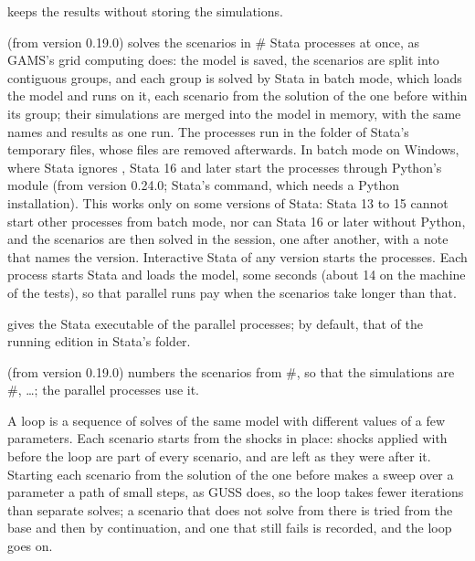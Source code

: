 \begin{optdesc}
\item[\opt{}{nostore}] keeps the results without storing the simulations.

\item[\optarg{par}{allel}{\#}] (from version 0.19.0) solves the scenarios in
\# Stata processes at once, as GAMS's grid computing does: the model is saved,
the scenarios are split into contiguous groups, and each group is solved by
Stata in batch mode, which loads the model and runs  on it,
each scenario from the solution of the one before within its group; their
simulations are merged into the model in memory, with the same names and
results as one run. The processes run in the folder of Stata's temporary
files, whose files are removed afterwards. In batch mode on Windows, where
Stata ignores , Stata 16 and later start the processes through
Python's  module (from version 0.24.0; Stata's 
command, which needs a Python installation). This works only on some
versions of Stata: Stata 13 to 15 cannot start other processes from batch
mode, nor can Stata 16 or later without Python, and the scenarios are then
solved in the session, one after another, with a note that names the
version. Interactive Stata of any version starts the processes. Each process
starts Stata and loads the model, some seconds (about 14 on the machine of
the tests), so that parallel runs pay when the scenarios take longer than
that.

\item[\optarg{stata}{exe}{path}] gives the Stata executable of the parallel
processes; by default, that of the running edition in Stata's folder.

\item[\optarg{}{first}{\#}] (from version 0.19.0) numbers the scenarios from
\#, so that the simulations are \#, \dots; the parallel processes
use it.
\end{optdesc}


A loop is a sequence of solves of the same model with different values of a
few parameters. Each scenario starts from the shocks in place: shocks applied
with  before the loop are part of every scenario, and are
left as they were after it. Starting each scenario from the solution of the
one before makes a sweep over a parameter a path of small steps, as GUSS does,
so the loop takes fewer iterations than separate solves; a scenario that does
not solve from there is tried from the base and then by continuation, and one
that still fails is recorded, and the loop goes on.

